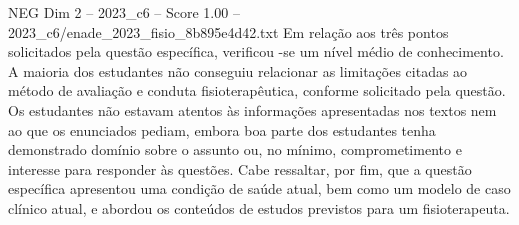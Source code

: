 \begin{textsample}{NEG Dim 2 – 2023\_c6 – Score 1.00 – 2023\_c6/enade\_2023\_fisio\_8b895e4d42.txt}
Em relação aos três pontos solicitados pela questão específica, verificou -se um nível médio de conhecimento.
A maioria dos estudantes não conseguiu relacionar as limitações citadas ao método de avaliação e conduta fisioterapêutica, conforme solicitado pela questão.
Os estudantes não estavam atentos às informações apresentadas nos textos nem ao que os enunciados pediam, embora boa parte dos estudantes tenha demonstrado domínio sobre o assunto ou, no mínimo, comprometimento e interesse para responder às questões.
Cabe ressaltar, por fim, que a questão específica apresentou uma condição de saúde atual, bem como um modelo de caso clínico atual, e abordou os conteúdos de estudos previstos para um fisioterapeuta.

\end{textsample}
